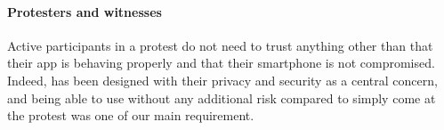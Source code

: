 \paragraph{Protesters and witnesses} Active participants in a protest do not need to trust anything other than that their app is behaving properly and that their smartphone is not compromised. Indeed, \CROCUS has been designed with their privacy and security as a central concern, and being able to use \CROCUS without any additional risk compared to simply come at the protest was one of our main requirement.
